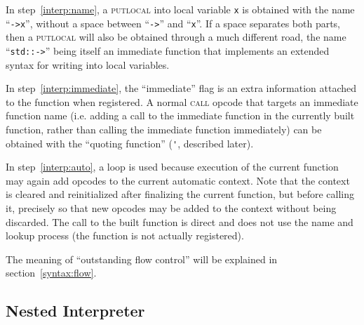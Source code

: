 In step~\ref{interp:name}, a \textsc{putlocal} into local variable
\verb|x| is obtained with the name ``\verb|->x|'', without a space
between ``\verb|->|'' and ``\verb|x|''. If a space separates both parts,
then a \textsc{putlocal} will also be obtained through a much different
road, the name ``\verb|std::->|'' being itself an immediate function
that implements an extended syntax for writing into local variables.

In step~\ref{interp:immediate}, the ``immediate'' flag is an extra
information attached to the function when registered. A normal
\textsc{call} opcode that targets an immediate function name (i.e.
adding a call to the immediate function in the currently built function,
rather than calling the immediate function immediately) can be obtained
with the ``quoting function'' (\verb|'|, described later).

In step~\ref{interp:auto}, a loop is used because execution of the
current function may again add opcodes to the current automatic context.
Note that the context is cleared and reinitialized after finalizing the
current function, but before calling it, precisely so that new opcodes
may be added to the context without being discarded. The call to the
built function is direct and does not use the name and lookup process
(the function is not actually registered).

The meaning of ``outstanding flow control'' will be explained in
section~\ref{syntax:flow}.

\subsection{Nested Interpreter}\label{syntax:nested}

